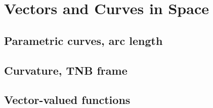 
\section{Vectors and Curves in Space}

\subsection{Parametric curves, arc length}


\subsection{Curvature, TNB frame}


\subsection{Vector-valued functions}

